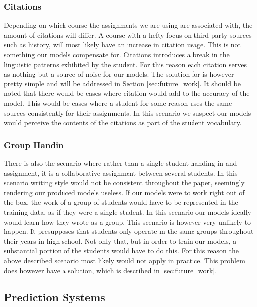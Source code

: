 \subsubsection{Citations}

Depending on which course the assignments we are using are associated with, the
amount of citations will differ. A course with a hefty focus on third party
sources such as history, will most likely have an increase in citation usage.
This is not something our models compensate for. Citations introduces a break in
the linguistic patterns exhibited by the student. For this reason each citation
serves as nothing but a source of noise for our models. The solution for is
however pretty simple and will be addressed in Section \ref{sec:future_work}.
It should be noted that there would be cases where citation would add to the
accuracy of the model. This would be cases where a student for some reason
uses the same sources consistently for their assignments. In this scenario
we suspect our models would perceive the contents of the citations as part
of the student vocabulary.

\subsubsection{Group Handin}\label{subsubsec:group_handin}

There is also the scenario where rather than a single student handing in and
assignment, it is a collaborative assignment between several students. In this
scenario writing style would not be consistent throughout the paper, seemingly
rendering our produced models useless. If our models were to work right out of
the box, the work of a group of students would have to be represented in the
training data, as if they were a single student. In this scenario our models
ideally would learn how they wrote as a group. This scenario is however very
unlikely to happen. It presupposes that students only operate in the same
groups throughout their years in high school. Not only that, but in order to
train our models, a substantial portion of the students would have to do this.
For this reason the above described scenario most likely would not apply in
practice. This problem does however have a solution, which is described in
\ref{sec:future_work}.


\subsection{Prediction Systems}

